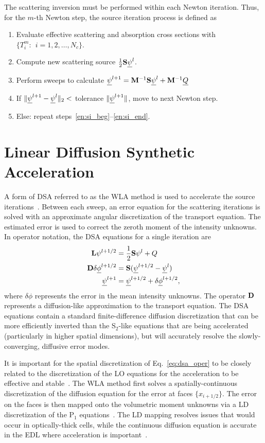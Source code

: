 The scattering inversion must be
performed within each Newton iteration.  Thus, for the $m$-th Newton step, the source
iteration process is defined as
\begin{enumerate}
    \item Evaluate effective scattering and absorption cross sections with
        ${\{T^m_i:\;\, i=1,2,\ldots,N_c\}}$.
    \item\label{en:si_beg} Compute new scattering source $\frac{1}{2}\mathbf{S} \underline{\psi}^l$.
    \item Perform sweeps to calculate $\underline{\psi}^{l+1} = \mathbf{M}^{-1} \mathbf{S}\underline{\psi}^{l} + \mathbf{M}^{-1} \underline{Q}$
    \item\label{en:si_end} If $\|\underline{\psi}^{l+1} - \underline{\psi}^{l} \|_2 < $ tolerance
        $\|\underline{\psi}^{l+1}\|$, move to next Newton step.
    \item Else: repeat steps~\ref{en:si_beg}--\ref{en:si_end}.
\end{enumerate}

\section{Linear Diffusion Synthetic Acceleration}

A form of DSA referred to as the WLA method is used to accelerate the source
iterations~\cite{wla,wla_thesis}. 
Between each sweep, an error equation for the scattering iterations is solved with an approximate angular
discretization of the transport equation.  The estimated error is used to correct the
zeroth moment of the intensity unknowns.  In operator notation, the DSA equations for a single
iteration are
\begin{align}
    \mathbf{L} \psi^{l+1/2} &= \frac{1}{2}\mathbf{S} \psi^{l} + Q \\
    \mathbf{D} \delta \underline{\phi}^{l+1/2} &= \mathbf{S} (\underline{\psi}^{l+1/2} - \underline{\psi}^{l}) \label{eq:dsa_oper} \\
     \underline{\psi}^{l+1} &= \underline{\psi}^{l+1/2} + \delta \underline{\phi}^{l+1/2},
\end{align}
where $\delta \phi$ represents the error in the mean intensity unknowns.
The operator $\mathbf{D}$ represents a diffusion-like approximation to the transport equation. The DSA equations contain a standard
finite-difference diffusion discretization that can be more efficiently
inverted than the S$_2$-like equations that are being accelerated (particularly in higher
spatial dimensions), but will accurately resolve the
slowly-converging, diffusive error modes. 

It is important for the spatial discretization of Eq.~\eqref{eq:dsa_oper} to be closely related to the discretization of the LO equations for the
acceleration to be effective and stable~\cite{adams_dsa}.  The WLA method first solves a spatially-continuous
discretization of the diffusion equation
for the error at faces $\{x_{i+1/2}\}$.  The error on the faces is then mapped onto the
volumetric moment unknowns via a LD discretization of the P$_1$ equations~\cite{wla}.
The LD mapping resolves issues that would occur in optically-thick cells, while the
continuous diffusion equation is accurate in the EDL where acceleration is important~\cite{adams_dsa}.

